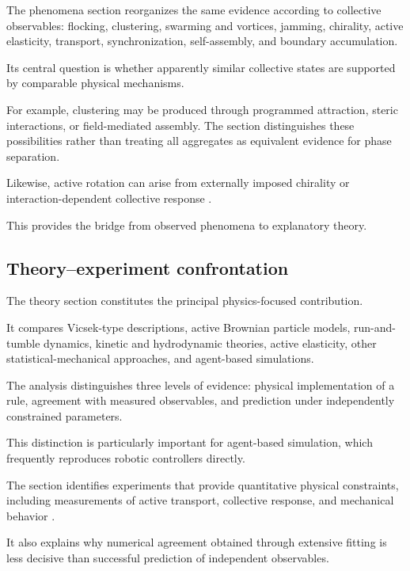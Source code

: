 The phenomena section reorganizes the same
evidence according to collective observables:
flocking, clustering, swarming and vortices,
jamming, chirality, active elasticity,
transport, synchronization, self-assembly,
and boundary accumulation.

Its central question is whether apparently
similar collective states are supported
by comparable physical mechanisms.

For example, clustering may be produced
through programmed attraction, steric
interactions, or field-mediated assembly.
The section distinguishes these possibilities
rather than treating all aggregates as
equivalent evidence for phase separation.

Likewise, active rotation can arise from
externally imposed chirality or
interaction-dependent collective response
\cite{Fruchart2022nonreciprocalphase,Chen2024persistentandrespo,Casiulis2025ageometricconditio}.

This provides the bridge from observed
phenomena to explanatory theory.

\subsection*{Theory--experiment confrontation}

The theory section constitutes the
principal physics-focused contribution.

It compares Vicsek-type descriptions,
active Brownian particle models,
run-and-tumble dynamics,
kinetic and hydrodynamic theories,
active elasticity,
other statistical-mechanical approaches,
and agent-based simulations.

The analysis distinguishes three
levels of evidence:
physical implementation of a rule,
agreement with measured observables,
and prediction under independently
constrained parameters.

This distinction is particularly important
for agent-based simulation, which frequently
reproduces robotic controllers directly.

The section identifies experiments
that provide quantitative physical
constraints, including measurements
of active transport, collective response,
and mechanical behavior
\cite{Tarcai2011patternstransition,Barone2024experimentalandnum,Zion2023morphologicalcomput,Binysh2026moreislessinunpe}.

It also explains why numerical agreement
obtained through extensive fitting
is less decisive than successful
prediction of independent observables.

